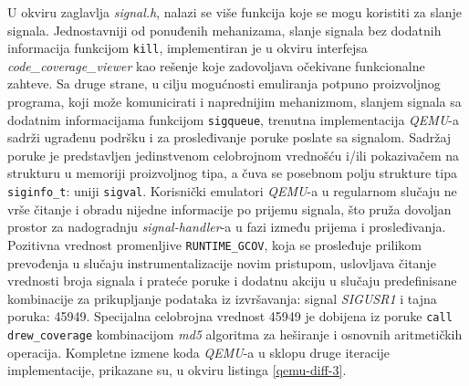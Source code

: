 \documentclass[12pt,oneside]{memoir}
\newcommand{\kod}[1]{\texttt{#1}}
\newcommand{\strano}[1]{\textit{#1}}
\begin{document}
U okviru zaglavlja \strano{signal.h}, nalazi se više funkcija koje se mogu koristiti za slanje signala. Jednostavniji od ponuđenih mehanizama, slanje signala bez dodatnih informacija funkcijom \kod{kill}, implementiran je u okviru interfejsa \strano{code\_coverage\_viewer} kao rešenje koje zadovoljava očekivane funkcionalne zahteve. Sa druge strane, u cilju mogućnosti emuliranja potpuno proizvoljnog programa, koji može komunicirati i naprednijim mehanizmom, slanjem signala sa dodatnim informacijama funkcijom \kod{sigqueue}, trenutna implementacija \strano{QEMU}-a sadrži ugrađenu podršku i za prosleđivanje poruke poslate sa signalom. Sadržaj poruke je predstavljen jedinstvenom celobrojnom vrednošću i/ili pokazivačem na strukturu u memoriji proizvoljnog tipa, a čuva se posebnom polju strukture tipa \kod{siginfo\_t}: uniji \kod{sigval}. Korisnički emulatori \strano{QEMU}-a u regularnom slučaju ne vrše čitanje i obradu nijedne informacije po prijemu signala, što pruža dovoljan prostor za nadogradnju \strano{signal-handler}-a u fazi između prijema i prosleđivanja. Pozitivna vrednost promenljive \kod{RUNTIME\_GCOV}, koja se prosleđuje prilikom prevođenja u slučaju instrumentalizacije novim pristupom, uslovljava čitanje vrednosti broja signala i prateće poruke i dodatnu akciju u slučaju predefinisane kombinacije za prikupljanje podataka iz izvršavanja: signal \strano{SIGUSR1} i tajna poruka: 45949. Specijalna celobrojna vrednost 45949 je dobijena iz poruke \kod{call drew\_coverage} kombinacijom \strano{md5} algoritma za heširanje i osnovnih aritmetičkih operacija. Kompletne izmene koda \strano{QEMU}-a u sklopu druge iteracije implementacije, prikazane su, u okviru listinga \ref{qemu-diff-3}.

\newpage
\end{document}
